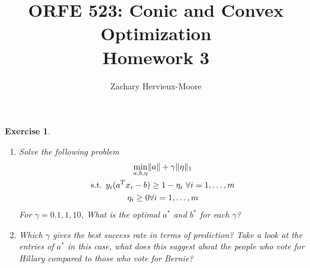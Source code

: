 \documentclass[12pt]{article}
\title{ORFE 523: Conic and Convex Optimization \\ Homework 3}
\author{Zachary Hervieux-Moore}
\date{\displaydate{date}}
\theoremstyle{colon}
\newtheorem{exercise}{Exercise}
\begin{document}
\maketitle

\clearpage

\begin{exercise}
  \leavevmode
  \begin{enumerate}[label=\arabic*)]
    \item Solve the following problem
      \begin{gather*}
        \min_{a, b, \eta} \lVert a \rVert + \gamma \lVert \eta \rVert_1 \\
        \text{s.t. } y_i (a^T x_i - b) \geq 1 - \eta_i \ \forall i = 1, \mathellipsis, m \\
        \eta_i \geq 0 \forall i = 1, \mathellipsis, m
      \end{gather*}
      For $\gamma = 0.1, 1, 10$, What is the optimal $a^*$ and $b^*$ for each $\gamma$?

    \item Which $\gamma$ gives the best success rate in terms of prediction? Take a look at the entries of $a^*$ in this case, what does this suggest about the people who vote for Hillary compared to those who vote for Bernie?
  \end{enumerate}
\end{exercise}
\end{document}
